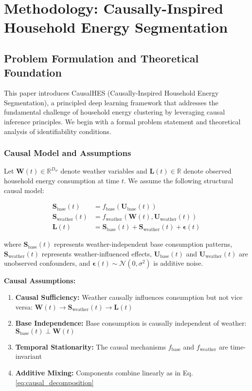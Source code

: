 \documentclass[journal]{IEEEtran}
\begin{document}
\section{Methodology: Causally-Inspired Household Energy Segmentation}

\subsection{Problem Formulation and Theoretical Foundation}

This paper introduces CausalHES (Causally-Inspired Household Energy Segmentation), a principled deep learning framework that addresses the fundamental challenge of household energy clustering by leveraging causal inference principles. We begin with a formal problem statement and theoretical analysis of identifiability conditions.

\subsubsection{Causal Model and Assumptions}

Let $\mathbf{W}(t) \in \mathbb{R}^{D_w}$ denote weather variables and $\mathbf{L}(t) \in \mathbb{R}$ denote observed household energy consumption at time $t$. We assume the following structural causal model:

\begin{align}
\mathbf{S}_{\text{base}}(t) &= f_{\text{base}}(\mathbf{U}_{\text{base}}(t)) \label{eq:base_generation}\\
\mathbf{S}_{\text{weather}}(t) &= f_{\text{weather}}(\mathbf{W}(t), \mathbf{U}_{\text{weather}}(t)) \label{eq:weather_generation}\\
\mathbf{L}(t) &= \mathbf{S}_{\text{base}}(t) + \mathbf{S}_{\text{weather}}(t) + \boldsymbol{\epsilon}(t) \label{eq:causal_decomposition}
\end{align}

where $\mathbf{S}_{\text{base}}(t)$ represents weather-independent base consumption patterns, $\mathbf{S}_{\text{weather}}(t)$ represents weather-influenced effects, $\mathbf{U}_{\text{base}}(t)$ and $\mathbf{U}_{\text{weather}}(t)$ are unobserved confounders, and $\boldsymbol{\epsilon}(t) \sim \mathcal{N}(0, \sigma^2)$ is additive noise.

\textbf{Causal Assumptions:}
\begin{enumerate}
    \item \textbf{Causal Sufficiency:} Weather causally influences consumption but not vice versa: $\mathbf{W}(t) \rightarrow \mathbf{S}_{\text{weather}}(t) \rightarrow \mathbf{L}(t)$
    \item \textbf{Base Independence:} Base consumption is causally independent of weather: $\mathbf{S}_{\text{base}}(t) \perp \mathbf{W}(t)$
    \item \textbf{Temporal Stationarity:} The causal mechanisms $f_{\text{base}}$ and $f_{\text{weather}}$ are time-invariant
    \item \textbf{Additive Mixing:} Components combine linearly as in Eq. \ref{eq:causal_decomposition}
\end{enumerate}
\end{document}
